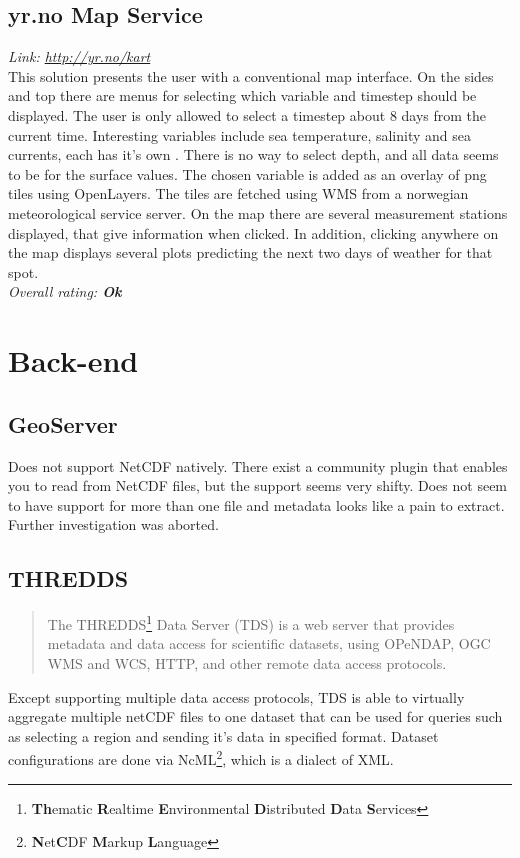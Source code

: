 \documentclass[11pt,a4paper,titlepage,oneside]{report}
\begin{document}
  \section{yr.no Map Service}
  \emph{Link: \url{http://yr.no/kart}} \\%
This solution presents the user with a conventional map interface. On the sides and top there are menus for selecting which variable and timestep should be displayed. The user is only allowed to select a timestep about 8 days from the current time. Interesting variables include sea temperature, salinity and sea currents, each has it’s own . There is no way to select depth, and all data seems to be for the surface values. The chosen variable is added as an overlay of png tiles using OpenLayers. The tiles are fetched using WMS from a norwegian meteorological service server. On the map there are several measurement stations displayed, that give information when clicked. In addition, clicking anywhere on the map displays several plots predicting the next two days of weather for that spot.
  \\ \emph{Overall rating: \textbf{Ok}}

\chapter{Back-end}

\section{GeoServer}
Does not support NetCDF natively. There exist a community plugin that enables you to read from NetCDF files, but the support seems very shifty. Does not seem to have support for more than one file and metadata looks like a pain to extract. Further investigation was aborted.

\section{THREDDS}
\begin{quote}
The THREDDS\footnote{\textbf{Th}ematic \textbf{R}ealtime \textbf{E}nvironmental \textbf{D}istributed \textbf{D}ata \textbf{S}ervices} Data Server (TDS) is a web server that provides metadata and data access for scientific datasets, using OPeNDAP, OGC WMS and WCS, HTTP, and other remote data access protocols. \cite{TDS:Web}
\end{quote}

  Except supporting multiple data access protocols, TDS is able to virtually aggregate multiple netCDF files to one dataset that can be used for queries such as selecting a region and sending it's data in specified format. Dataset configurations are done via NcML\footnote{\textbf{N}et\textbf{C}DF \textbf{M}arkup \textbf{L}anguage}, which is a dialect of XML.
\end{document}
